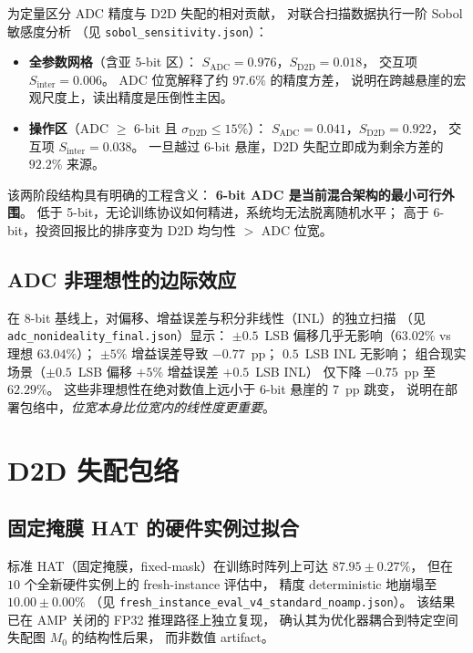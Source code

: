 为定量区分 ADC 精度与 D2D 失配的相对贡献，
对联合扫描数据执行一阶 Sobol 敏感度分析
（见 \texttt{sobol\_sensitivity.json}）：

\begin{itemize}
    \item \textbf{全参数网格}（含亚 5-bit 区）：
    $S_{\mathrm{ADC}} = 0.976$，$S_{\mathrm{D2D}} = 0.018$，
    交互项 $S_{\mathrm{inter}} = 0.006$。
    ADC 位宽解释了约 $97.6\%$ 的精度方差，
    说明在跨越悬崖的宏观尺度上，读出精度是压倒性主因。
    \item \textbf{操作区}（ADC $\ge$ 6-bit 且 $\sigma_{\mathrm{D2D}} \le 15\%$）：
    $S_{\mathrm{ADC}} = 0.041$，$S_{\mathrm{D2D}} = 0.922$，
    交互项 $S_{\mathrm{inter}} = 0.038$。
    一旦越过 6-bit 悬崖，D2D 失配立即成为剩余方差的 $92.2\%$ 来源。
\end{itemize}

该两阶段结构具有明确的工程含义：
\textbf{6-bit ADC 是当前混合架构的最小可行外围}。
低于 5-bit，无论训练协议如何精进，系统均无法脱离随机水平；
高于 6-bit，投资回报比的排序变为 D2D 均匀性 $>$ ADC 位宽。

\subsection{ADC 非理想性的边际效应}

在 8-bit 基线上，对偏移、增益误差与积分非线性（INL）的独立扫描
（见 \texttt{adc\_nonideality\_final.json}）显示：
$\pm 0.5$~LSB 偏移几乎无影响（$63.02\%$ vs 理想 $63.04\%$）；
$\pm 5\%$ 增益误差导致 $-0.77$~pp；
$0.5$~LSB INL 无影响；
组合现实场景（$\pm 0.5$~LSB 偏移 $+5\%$ 增益误差 $+0.5$~LSB INL）
仅下降 $-0.75$~pp 至 $62.29\%$。
这些非理想性在绝对数值上远小于 6-bit 悬崖的 $7$~pp 跳变，
说明在部署包络中，\emph{位宽本身比位宽内的线性度更重要}。


\section{D2D 失配包络}
\label{sec:d2d-envelope}

\subsection{固定掩膜 HAT 的硬件实例过拟合}

标准 HAT（固定掩膜，fixed-mask）在训练时阵列上可达 $87.95\pm0.27\%$，
但在 $10$ 个全新硬件实例上的 fresh-instance 评估中，
精度 deterministic 地崩塌至 $10.00\pm0.00\%$
（见 \texttt{fresh\_instance\_eval\_v4\_standard\_noamp.json}）。
该结果已在 AMP 关闭的 FP32 推理路径上独立复现，
确认其为优化器耦合到特定空间失配图 $M_0$ 的结构性后果，
而非数值 artifact。

